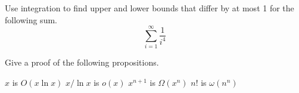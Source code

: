 \documentclass[12pt,oneside]{article}
\begin{document}
\newpage


\begin{problem}{10}
Use integration to find upper and lower bounds that differ by at most 1 for the following sum.
%
\[
\sum_{i=1}^{\infty} \frac{1}{i^4}
\]

\end{problem}


\newpage

\begin{problem}{12}
Give a proof of the following propositions.

\bparts

$x$ is $O\left( x\ln{x} \right)$
$x/ \ln{x}$  is $o  \left( x \right)$
$x^{n+1}$ is $\Omega \left( x^n \right)$
$n!$ is $\omega \left( n^n \right)$

\eparts
\end{problem}
\end{document}
